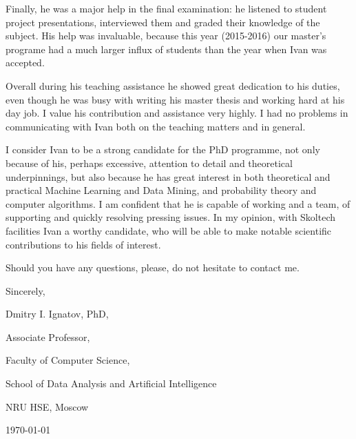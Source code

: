\documentclass[14pt]{extarticle}
\begin{document}
Finally, he was a major help in the final examination: he listened to student project
presentations, interviewed them and graded their knowledge of the subject. His help
was invaluable, because this year (2015-2016) our master's programe had a much larger
influx of students than the year when Ivan was accepted. \par\medskip

Overall during his teaching assistance he showed great dedication to his duties, even
though he was busy with writing his master thesis and working hard at his day job. I
value his contribution and assistance very highly. I had no problems in communicating
with Ivan both on the teaching matters and in general. \par\medskip

I consider Ivan to be a strong candidate for the PhD programme, not only because of
his, perhaps excessive, attention to detail and theoretical underpinnings, but also
because he has great interest in both theoretical and practical Machine Learning and
Data Mining, and probability theory and computer algorithms. I am confident that he
is capable of working and a team, of supporting and quickly resolving pressing issues.
In my opinion, with Skoltech facilities Ivan a worthy candidate, who will be able to
make notable scientific contributions to his fields of interest. \par\medskip

Should you have any questions, please, do not hesitate to contact me. \par\bigskip

Sincerely, \par \medskip

Dmitry I. Ignatov, PhD, \par
Associate Professor, \par
Faculty of Computer Science, \par
School of Data Analysis and Artificial Intelligence \par
NRU HSE, Moscow \par
\hfill\today
\end{document}

